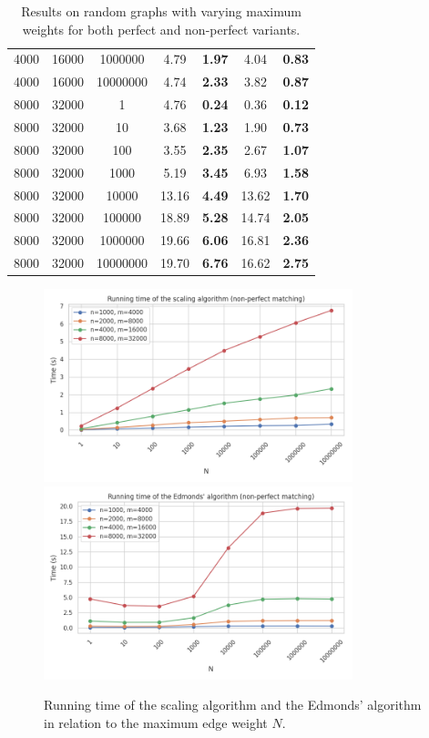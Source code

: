 \begin{table}
\begin{tabular}{
ccc|cc|cc}
4000 & 16000 & 1000000 & 4.79 & \textbf{1.97} & 4.04 & \textbf{0.83} \\
4000 & 16000 & 10000000 & 4.74 & \textbf{2.33} & 3.82 & \textbf{0.87} \\
\hline
8000 & 32000 & 1 & 4.76 & \textbf{0.24} & 0.36 & \textbf{0.12} \\
8000 & 32000 & 10 & 3.68 & \textbf{1.23} & 1.90 & \textbf{0.73} \\
8000 & 32000 & 100 & 3.55 & \textbf{2.35} & 2.67 & \textbf{1.07} \\
8000 & 32000 & 1000 & 5.19 & \textbf{3.45} & 6.93 & \textbf{1.58} \\
8000 & 32000 & 10000 & 13.16 & \textbf{4.49} & 13.62 & \textbf{1.70} \\
8000 & 32000 & 100000 & 18.89 & \textbf{5.28} & 14.74 & \textbf{2.05} \\
8000 & 32000 & 1000000 & 19.66 & \textbf{6.06} & 16.81 & \textbf{2.36} \\
8000 & 32000 & 10000000 & 19.70 & \textbf{6.76} & 16.62 & \textbf{2.75} \\
\end{tabular}
\caption{Results on random graphs with varying maximum weights for both perfect and non-perfect variants.}\label{tab:weight}
\end{table}

\begin{figure}
    \centering
    \includegraphics*[width=0.8\textwidth]{figures/Nweight.png}
    \includegraphics*[width=0.8\textwidth]{figures/Eweight.png}
    \caption{Running time of the scaling algorithm and the Edmonds' algorithm in relation to the maximum edge weight $N$.}\label{fig:weight}
\end{figure}

